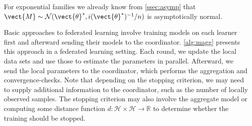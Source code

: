 For exponential families we already know from  \autoref{ssec:asymp} that \\$\vect{M} \sim \mathcal{N}(\vect{\theta}^*, i(\vect{\theta}^*)^{-1}/n)$ is asymptotically normal.

Basic approaches to federated learning involve training models on each learner first and afterward sending their models to the coordinator.
\autoref{alg:magg} presents this approach in a federated learning setting. 
Each round, we update the local data sets and use those to estimate the parameters in parallel. 
Afterward, we send the local parameters to the coordinator, which performs the aggregation and convergence-checks.
Note that depending on the stopping criterion, we may need to supply additional information to the coordinator, such as the number of locally observed samples. 
The stopping criterion may also involve the aggregate model or computing some distance function $d: \mathcal{H} \times \mathcal{H}  \rightarrow \mathbb{R}$  to determine whether the training should be stopped.
